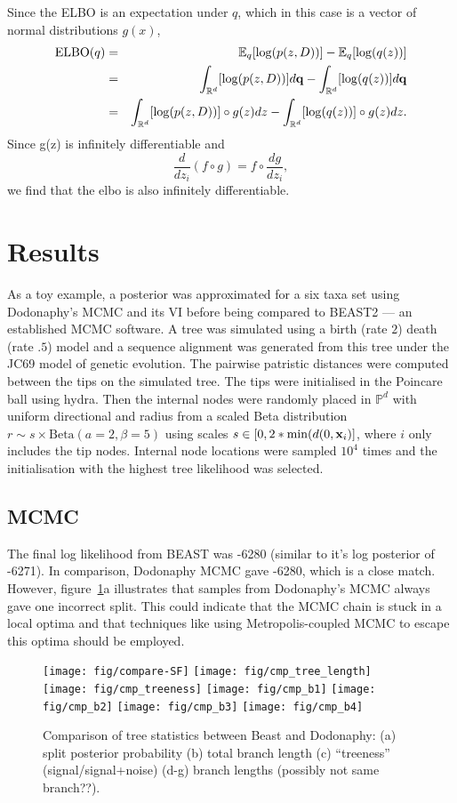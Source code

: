 \documentclass[11pt]{article}
\newcommand{\be}{\begin{equation*}}
\newcommand{\ee}{\end{equation*}}
\newcommand{\bee}{\begin{eqnarray*}}
\newcommand{\eee}{\end{eqnarray*}}
\begin{document}
Since the ELBO is an expectation under $q$, which in this case is a vector of normal distributions $g(x)$,
\bee
\text{ELBO}(q) &=& \mathbb{E}_{q}[\log(p(z,D))] - \mathbb{E}_{q}[\log(q(z))]\\
&=& \int_{\mathbb{R}^{d}}[\log(p(z,D))] d\bold{q} - \int_{\mathbb{R}^{d}}[\log(q(z))] d\bold{q}\\
&=& \int_{\mathbb{R}^{d}}[\log(p(z,D))] \circ g(z) dz - \int_{\mathbb{R}^{d}}[\log(q(z))] \circ g(z) dz.
\eee
Since g(z) is infinitely differentiable and
\be
\dfrac{d}{dz_{i}} (f \circ g) = f \circ \dfrac{dg}{dz_{i}},
\ee
we find that the elbo is also infinitely differentiable.



\section{Results}
As a toy example, a posterior was approximated for a six taxa set using Dodonaphy's MCMC and its VI before being compared to BEAST2 --- an established MCMC software.
A tree was simulated using a birth (rate $2$) death (rate $.5$) model and a sequence alignment was generated from this tree under the JC69 model of genetic evolution.
The pairwise patristic distances were computed between the tips on the simulated tree.
The tips were initialised in the Poincare ball using hydra.
Then the internal nodes were randomly placed in $\mathbb{P}^{d}$ with uniform directional and radius from a scaled Beta distribution $ r \sim s \times \text{Beta}(a=2, \beta=5)$ using scales $s \in [0, 2*\min(d(0, \bold{x}_{i})]$, where $i$ only includes the tip nodes.
Internal node locations were sampled $10^{4}$ times and the initialisation with the highest tree likelihood was selected.

\subsection{MCMC}
The final log likelihood from BEAST was -6280 (similar to it's log posterior of -6271). In comparison, Dodonaphy MCMC gave -6280, which is a close match.
However, figure~\ref{fig:stat_cmp}a illustrates that samples from Dodonaphy's MCMC always gave one incorrect split.
This could indicate that the MCMC chain is stuck in a local optima and that techniques like using Metropolis-coupled MCMC to escape this optima should be employed.

\begin{figure}[htbp]
\begin{center}
\texttt{[image: fig/compare-SF]}%
\texttt{[image: fig/cmp\_tree\_length]}%
\texttt{[image: fig/cmp\_treeness]}
\texttt{[image: fig/cmp\_b1]}%
\texttt{[image: fig/cmp\_b2]}%
\texttt{[image: fig/cmp\_b3]}%
\texttt{[image: fig/cmp\_b4]}
\caption{Comparison of tree statistics between Beast and Dodonaphy: (a) split posterior probability (b) total branch length (c) ``treeness'' (signal/signal+noise) (d-g) branch lengths (possibly not same branch??).}
\label{fig:stat_cmp}
\end{center}
\end{figure}
\end{document}
